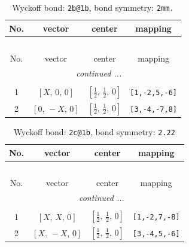\documentclass[fleqn,8pt]{jsarticle}
\begin{document}
\renewcommand{\arraystretch}{1.2}
\begin{longtable}{cccc}
\caption{Wyckoff bond: {\tt 2b@1b}, bond symmetry: {\tt 2mm.}}
 \\
 \hline \hline
No. & vector & center & mapping \\ \hline \endfirsthead

\multicolumn{3}{l}{\tablename\ \thetable{}} \\
 \hline \hline
No. & vector & center & mapping \\ \hline \endhead

 \hline \hline
\multicolumn{3}{r}{\footnotesize\it continued ...} \\ \endfoot

 \hline \hline
\multicolumn{3}{r}{} \\ \endlastfoot

1 & $\left[ X,\, 0,\, 0 \right]$ & $\left[ \frac{1}{2},\, \frac{1}{2},\, 0 \right]$ & {\tt [1,-2,5,-6]} \\ \hline
2 & $\left[ 0,\, - X,\, 0 \right]$ & $\left[ \frac{1}{2},\, \frac{1}{2},\, 0 \right]$ & {\tt [3,-4,-7,8]} \\
\end{longtable}
\renewcommand{\arraystretch}{1.2}
\begin{longtable}{cccc}
\caption{Wyckoff bond: {\tt 2c@1b}, bond symmetry: {\tt 2.22}}
 \\
 \hline \hline
No. & vector & center & mapping \\ \hline \endfirsthead

\multicolumn{3}{l}{\tablename\ \thetable{}} \\
 \hline \hline
No. & vector & center & mapping \\ \hline \endhead

 \hline \hline
\multicolumn{3}{r}{\footnotesize\it continued ...} \\ \endfoot

 \hline \hline
\multicolumn{3}{r}{} \\ \endlastfoot

1 & $\left[ X,\, X,\, 0 \right]$ & $\left[ \frac{1}{2},\, \frac{1}{2},\, 0 \right]$ & {\tt [1,-2,7,-8]} \\ \hline
2 & $\left[ X,\, - X,\, 0 \right]$ & $\left[ \frac{1}{2},\, \frac{1}{2},\, 0 \right]$ & {\tt [3,-4,5,-6]} \\
\end{longtable}
\renewcommand{\arraystretch}{1.2}
\end{document}
